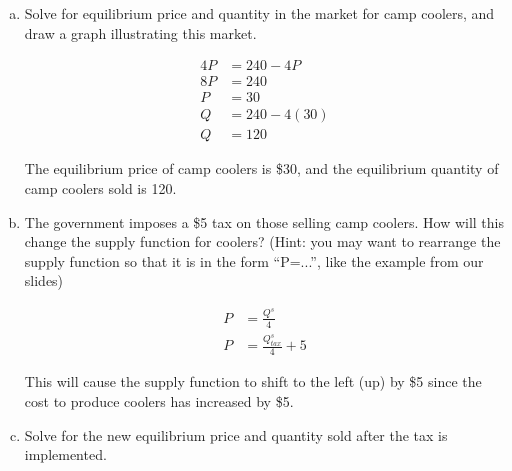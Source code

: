 \documentclass{article}
\begin{document}
\begin{enumerate}[(a)]
    \item Solve for equilibrium price and quantity in the market for camp coolers, and draw a graph illustrating this market.
    
    \begin{align*}
        4P &= 240 - 4P\\
        8P &= 240\\
        P &= 30\\
        Q &= 240 - 4(30)\\
        Q &= 120
    \end{align*}

    The equilibrium price of camp coolers is \$30, and the equilibrium quantity of camp coolers sold is 120.


    \item The government imposes a \$5 tax on those selling camp coolers. How will this change the supply function for coolers? (Hint: you may want to rearrange the supply function so that it is in the form “P=...”, like the example from our slides)
    
    \begin{align*}
        P &= \frac{Q^s}{4}\\
        P &= \frac{Q^s_{tax}}{4} + 5
    \end{align*}

    This will cause the supply function to shift to the left (up) by \$5 since the cost to produce coolers has increased by \$5.
    \pagebreak
    \item Solve for the new equilibrium price and quantity sold after the tax is implemented.
    

\end{enumerate}
\end{document}
